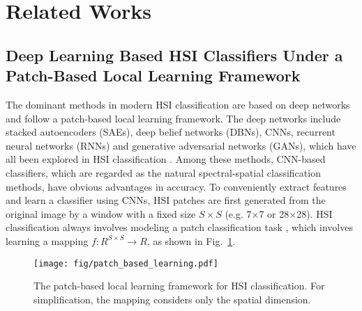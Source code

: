 \documentclass[journal]{IEEEtran}
\begin{document}
\section{Related Works}
\label{sec:relate}




\subsection{Deep Learning Based HSI Classifiers Under a Patch-Based Local Learning Framework}
The dominant methods in modern HSI classification are based on deep networks and follow a patch-based local learning framework.
The deep networks include stacked autoencoders (SAEs), deep belief networks (DBNs), CNNs, recurrent neural networks (RNNs) and generative adversarial networks (GANs), which have all been explored in HSI classification \cite{chen2014deep, chen2015spectral,hu2015deep,chen2016deep, zhao2016spectral,xu2018spectral, gong2019cnn,hang2019cascaded, zhou2019learning}.
Among these methods, CNN-based classifiers, which are regarded as the natural spectral-spatial classification methods, have obvious advantages in accuracy.
To conveniently extract features and learn a classifier using CNNs, HSI patches are first generated from the original image by a window with a fixed size $S \times S$ (e.g. 7$\times$7 or 28$\times$28).
HSI classification always involves modeling a patch classification task \cite{ghamisi2018new, li2019deep}, which involves learning a mapping $f: R^{S\times S}\rightarrow R$, as shown in Fig.~\ref{fig:pbl}.

\begin{figure}[h]
  \centering
  \texttt{[image: fig/patch\_based\_learning.pdf]}
  \caption{The patch-based local learning framework for HSI classification. For simplification, the mapping considers only the spatial dimension.}
  \label{fig:pbl}
\end{figure}
\end{document}
